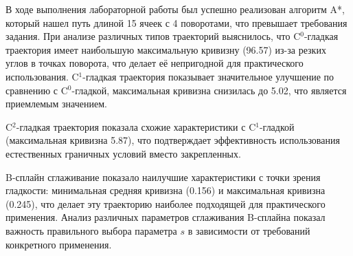 В ходе выполнения лабораторной работы был успешно реализован алгоритм A*, который нашел путь длиной 15 ячеек с 4 поворотами, что превышает требования задания. При анализе различных типов траекторий выяснилось, что C$^0$-гладкая траектория имеет наибольшую максимальную кривизну (96.57) из-за резких углов в точках поворота, что делает её непригодной для практического использования. C$^1$-гладкая траектория показывает значительное улучшение по сравнению с C$^0$-гладкой, максимальная кривизна снизилась до 5.02, что является приемлемым значением. 

C$^2$-гладкая траектория показала схожие характеристики с C$^1$-гладкой (максимальная кривизна 5.87), что подтверждает эффективность использования естественных граничных условий вместо закрепленных.

B-сплайн сглаживание показало наилучшие характеристики с точки зрения гладкости: минимальная средняя кривизна (0.156) и максимальная кривизна (0.245), что делает эту траекторию наиболее подходящей для практического применения. Анализ различных параметров сглаживания B-сплайна показал важность правильного выбора параметра $s$ в зависимости от требований конкретного применения.

